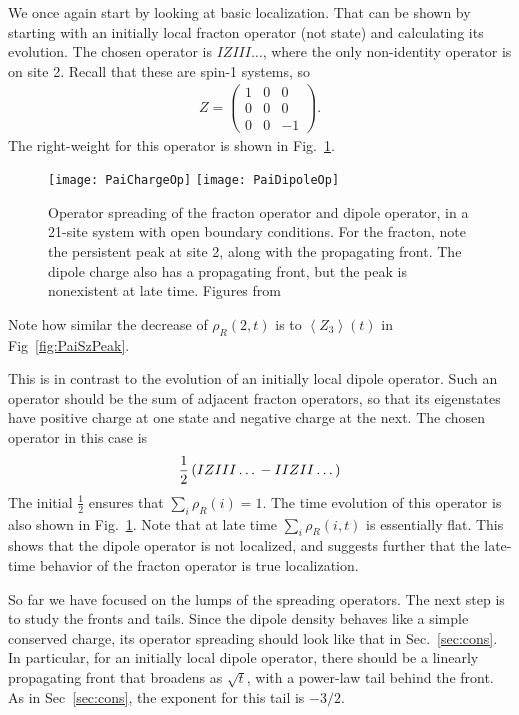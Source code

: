 \documentclass[a4paper,12pt]{article}
\renewcommand{\th}[1]{\frac{1}{#1}}
\newcommand{\ex}[1]{\left\langle #1 \right\rangle}
\newcommand{\note}[1]{{\color{red}{#1}}}
\begin{document}
We once again start by looking at basic localization. That can be shown by starting with an initially local fracton operator (not state) and calculating its evolution. The chosen operator is $IZIII\dots$, where the only non-identity operator is on site 2. Recall that these are spin-1 systems, so 
\begin{align}
Z = \begin{pmatrix} 1 & 0 & 0 \\ 0 & 0 & 0 \\ 0 & 0 & -1 \end{pmatrix}.
\end{align}
The right-weight for this operator is shown in Fig.~\ref{fig:PaiChargeOp}.
\begin{figure}
	\centering
	\texttt{[image: PaiChargeOp]}
	\texttt{[image: PaiDipoleOp]}
	\caption{Operator spreading of the fracton operator and dipole operator, in a 21-site system with open boundary conditions. For the fracton, note the persistent peak at site 2, along with the propagating front. The dipole charge also has a propagating front, but the peak is nonexistent at late time. Figures from~\cite{PaiFracton}}
	\label{fig:PaiChargeOp}
\end{figure}
Note how similar the decrease of $\rho_R(2,t)$ is to $\ex{Z_3}(t)$ in Fig~\ref{fig:PaiSzPeak}.

This is in contrast to the evolution of an initially local dipole operator. Such an operator should be the sum of adjacent fracton operators, so that its eigenstates have positive charge at one state and negative charge at the next. The chosen operator in this case is 
\begin{align}
\th{2}\left(IZIII\dots \vphantom{j}-IIZII\dots\right)
\end{align}
\note{Shouldn't it be $\th{\sqrt{2}}$?} The initial $\th{2}$ ensures that $\sum_i\rho_R(i)=1$. The time evolution of this operator is also shown in Fig.~\ref{fig:PaiChargeOp}. Note that at late time $\sum_i\rho_R(i, t)$ is essentially flat. This shows that the dipole operator is not localized, and suggests further that the late-time behavior of the fracton operator is true localization. 

So far we have focused on the lumps of the spreading operators. The next step is to study the fronts and tails. Since the dipole density behaves like a simple conserved charge, its operator spreading should look like that in Sec.~\ref{sec:cons}. In particular, for an initially local dipole operator, there should be a linearly propagating front that broadens as $\sqrt{t}$, with a power-law tail behind the front. As in Sec~\ref{sec:cons}, the exponent for this tail is $-3/2$.
\end{document}
